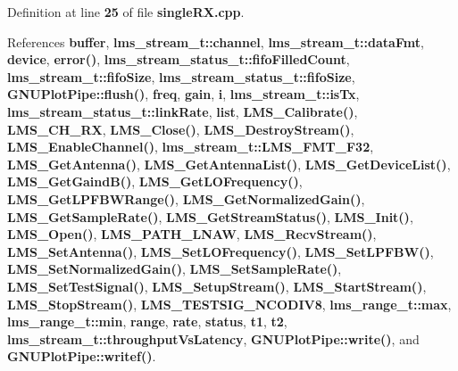 Definition at line {\bf 25} of file {\bf single\+R\+X.\+cpp}.



References {\bf buffer}, {\bf lms\+\_\+stream\+\_\+t\+::channel}, {\bf lms\+\_\+stream\+\_\+t\+::data\+Fmt}, {\bf device}, {\bf error()}, {\bf lms\+\_\+stream\+\_\+status\+\_\+t\+::fifo\+Filled\+Count}, {\bf lms\+\_\+stream\+\_\+t\+::fifo\+Size}, {\bf lms\+\_\+stream\+\_\+status\+\_\+t\+::fifo\+Size}, {\bf G\+N\+U\+Plot\+Pipe\+::flush()}, {\bf freq}, {\bf gain}, {\bf i}, {\bf lms\+\_\+stream\+\_\+t\+::is\+Tx}, {\bf lms\+\_\+stream\+\_\+status\+\_\+t\+::link\+Rate}, {\bf list}, {\bf L\+M\+S\+\_\+\+Calibrate()}, {\bf L\+M\+S\+\_\+\+C\+H\+\_\+\+RX}, {\bf L\+M\+S\+\_\+\+Close()}, {\bf L\+M\+S\+\_\+\+Destroy\+Stream()}, {\bf L\+M\+S\+\_\+\+Enable\+Channel()}, {\bf lms\+\_\+stream\+\_\+t\+::\+L\+M\+S\+\_\+\+F\+M\+T\+\_\+\+F32}, {\bf L\+M\+S\+\_\+\+Get\+Antenna()}, {\bf L\+M\+S\+\_\+\+Get\+Antenna\+List()}, {\bf L\+M\+S\+\_\+\+Get\+Device\+List()}, {\bf L\+M\+S\+\_\+\+Get\+Gaind\+B()}, {\bf L\+M\+S\+\_\+\+Get\+L\+O\+Frequency()}, {\bf L\+M\+S\+\_\+\+Get\+L\+P\+F\+B\+W\+Range()}, {\bf L\+M\+S\+\_\+\+Get\+Normalized\+Gain()}, {\bf L\+M\+S\+\_\+\+Get\+Sample\+Rate()}, {\bf L\+M\+S\+\_\+\+Get\+Stream\+Status()}, {\bf L\+M\+S\+\_\+\+Init()}, {\bf L\+M\+S\+\_\+\+Open()}, {\bf L\+M\+S\+\_\+\+P\+A\+T\+H\+\_\+\+L\+N\+AW}, {\bf L\+M\+S\+\_\+\+Recv\+Stream()}, {\bf L\+M\+S\+\_\+\+Set\+Antenna()}, {\bf L\+M\+S\+\_\+\+Set\+L\+O\+Frequency()}, {\bf L\+M\+S\+\_\+\+Set\+L\+P\+F\+B\+W()}, {\bf L\+M\+S\+\_\+\+Set\+Normalized\+Gain()}, {\bf L\+M\+S\+\_\+\+Set\+Sample\+Rate()}, {\bf L\+M\+S\+\_\+\+Set\+Test\+Signal()}, {\bf L\+M\+S\+\_\+\+Setup\+Stream()}, {\bf L\+M\+S\+\_\+\+Start\+Stream()}, {\bf L\+M\+S\+\_\+\+Stop\+Stream()}, {\bf L\+M\+S\+\_\+\+T\+E\+S\+T\+S\+I\+G\+\_\+\+N\+C\+O\+D\+I\+V8}, {\bf lms\+\_\+range\+\_\+t\+::max}, {\bf lms\+\_\+range\+\_\+t\+::min}, {\bf range}, {\bf rate}, {\bf status}, {\bf t1}, {\bf t2}, {\bf lms\+\_\+stream\+\_\+t\+::throughput\+Vs\+Latency}, {\bf G\+N\+U\+Plot\+Pipe\+::write()}, and {\bf G\+N\+U\+Plot\+Pipe\+::writef()}.



